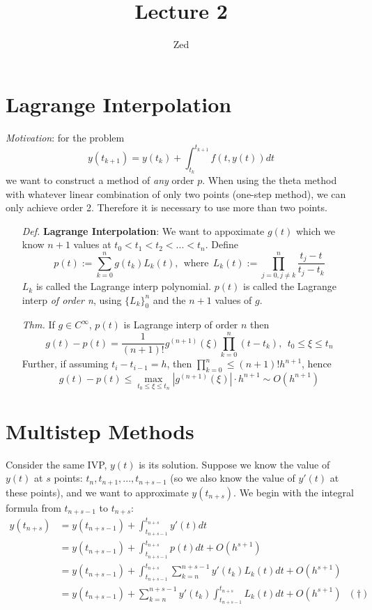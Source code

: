 \documentclass[a4paper, 11pt]{article}
\title{\textbf{Lecture 2}{}}
\author{Zed}{}
\begin{document}
\maketitle

\section{Lagrange Interpolation}
\emph{Motivation}: for the problem
$$
y(t_{k+1}) = y(t_k) + \int_{t_k}^{t_{k+1}} f(t, y(t))dt
$$
we want to construct a method of \emph{any} order $p$. When using the theta method with whatever linear combination of only two points (one-step method), we can only achieve order 2. Therefore it is necessary to use more than two points.

\begin{itemize}
	\item[\textit{Def.}] \textbf{Lagrange Interpolation}: We want to appoximate $g(t)$ which we know $n+1$ values at $t_0<t_1<t_2<...<t_n$. Define
	$$
	p(t) := \sum_{k=0}^n g(t_k)L_k(t),~~\text{where}~~L_k(t):=\prod_{j=0,j\ne k}^n\frac{t_j - t}{t_j - t_k}
	$$
	$L_k$ is called the Lagrange interp polynomial. $p(t)$ is called the Lagrange interp \emph{of order n}, using $\{L_k\}_0^n$ and the $n+1$ values of $g$.

	\item[\textit{Thm.}] If $g\in C^{\infty}$, $p(t)$ is Lagrange interp of order $n$ then
	$$
	g(t) - p(t) = \frac{1}{(n+1)!} g^{(n+1)}(\xi) \prod_{k=0}^n (t-t_k),~~t_0\leq\xi \leq t_n
	$$
	Further, if assuming $t_i-t_{i-1}=h$, then $\prod_{k=0}^n \leq (n+1)! h^{n+1}$, hence
	$$
	g(t) - p(t) \leq \max\limits_{t_0\leq \xi \leq t_n}|g^{(n+1)}(\xi)|\cdot h^{n+1} \sim O(h^{n+1})
	$$
\end{itemize}

\section{Multistep Methods}
Consider the same IVP, $y(t)$ is its solution. 
Suppose we know the value of $y(t)$ at $s$ points: $t_n, t_{n+1}, ..., t_{n+s-1}$ (so we also know the value of $y'(t)$ at these points), and we want to approximate $y(t_{n+s})$. We begin with the integral formula from $t_{n+s-1}$ to $t_{n+s}$:
\begin{equation}
	\begin{split}
		y(t_{n+s}) &= y(t_{n+s-1}) + \int_{t_{n+s-1}}^{t_{n+s}} y'(t) dt \\
		&= y(t_{n+s-1}) + \int_{t_{n+s-1}}^{t_{n+s}} p(t)dt + O(h^{s+1}) \\
		&= y(t_{n+s-1}) + \int_{t_{n+s-1}}^{t_{n+s}} \sum_{k=n}^{n+s-1}y'(t_k)L_k(t)dt + O(h^{s+1}) \\
		&= y(t_{n+s-1}) + \sum_{k=n}^{n+s-1}y'(t_k)\int_{t_{n+s-1}}^{t_{n+s}} L_k(t)dt + O(h^{s+1})~~~(\dag)\\
	\end{split}
\end{equation}
\end{document}
